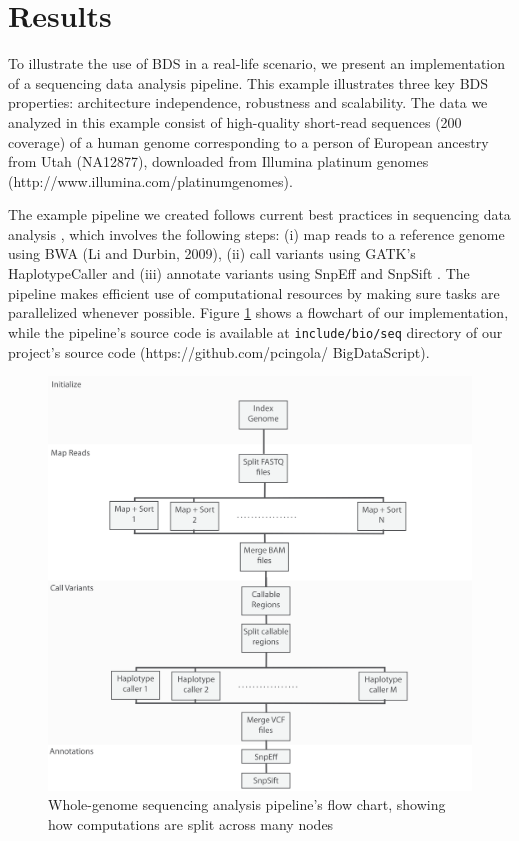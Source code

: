\section{Results}

To illustrate the use of BDS in a real-life scenario, we present an implementation of a sequencing data analysis pipeline. This example illustrates three key BDS properties: architecture independence, robustness and scalability. The data we analyzed in this example consist of high-quality short-read sequences (200 coverage) of a human genome corresponding to a person of European ancestry from Utah (NA12877), downloaded from Illumina platinum genomes (http://www.illumina.com/platinumgenomes).

The example pipeline we created follows current best practices in sequencing data analysis \cite{mckenna2010genome}, which involves the following steps: (i) map reads to a reference genome using BWA (Li and Durbin, 2009), (ii) call variants using GATK’s HaplotypeCaller and (iii) annotate variants using SnpEff \cite{cingolani2012program} and SnpSift \cite{cingolani2012using}. The pipeline makes efficient use of computational resources by making sure tasks are parallelized whenever possible. Figure \ref{fig:bdspipeline} shows a flowchart of our implementation, while the pipeline’s source code is available at \texttt{include/bio/seq} directory of our project’s source code (https://github.com/pcingola/ BigDataScript).

\begin{figure}
    \centering
    \includegraphics[width=14cm]{bds_figure_2_small.png}
    \caption{Whole-genome sequencing analysis pipeline’s flow chart, showing how computations are split across many nodes}
    \label{fig:bdspipeline}
\end{figure}

